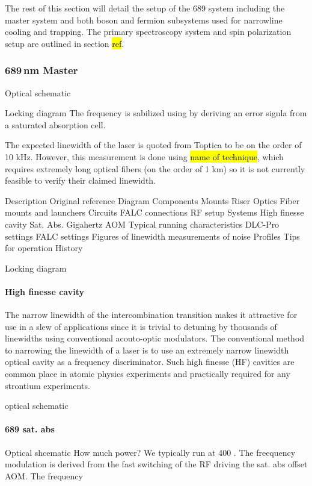 The rest of this section will detail the setup of the 689 system including the master system and both boson and fermion subsystems used for narrowline cooling and trapping.
The primary spectroscopy system and spin polarization setup are outlined in section \hl{ref}.
	
\subsubsection{689\,nm Master}

Optical schematic


Locking diagram
The frequency is sabilized using by deriving an error signla from a saturated absorption cell.


The expected linewidth of the laser is quoted from Toptica to be on the order of 10 kHz.
However, this measurement is done using \hl{name of technique}, which requires extremely long optical fibers (on the order of 1 km) so it is not currently feasible to verify their claimed linewidth.

Description
	Original reference
Diagram
Components
	Mounts
		Riser
	Optics
		Fiber mounts and launchers
	Circuits
		FALC connections
		RF setup
	Systems
		High finesse cavity
		Sat. Abs. 
		Gigahertz AOM
Typical running characteristics
	DLC-Pro settings
	FALC settings
		Figures of linewidth
		measurements of noise
Profiles
Tips for operation
History


Locking diagram

\paragraph{High finesse cavity}
The narrow linewidth of the intercombination transition makes it attractive for use in a slew of applications since it is trivial to detuning by thousands of linewidths using conventional acouto-optic modulators.
The conventional method to narrowing the linewidth of a laser is to use an extremely narrow linewidth optical cavity as a frequency discriminator.
Such high finesse (HF) cavities are common place in atomic physics experiments and practically required for any strontium experiments.

optical schematic


\paragraph{689 sat. abs}
Optical shcematic
How much power?
We typically run at 400 \degree.
The freequency modulation is derived from the fast switching of the RF driving the sat. abs offset AOM.
The frequency

